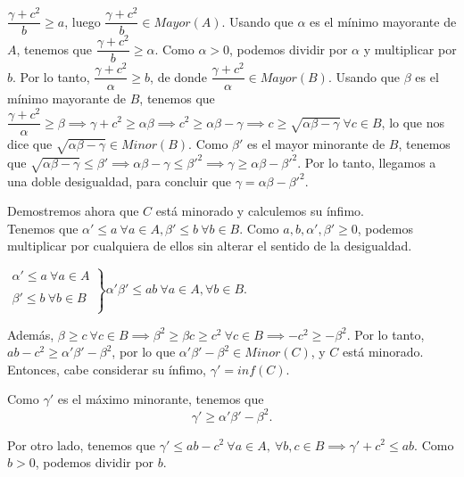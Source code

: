 \documentclass[10pt,a4paper]{article}
\begin{document}
	$\dfrac{\gamma + c^2}{b} \geq a$, luego $\dfrac{\gamma+c^2}{b} \in Mayor(A)$. Usando que $\alpha$ es el mínimo mayorante de $A$, tenemos que $\dfrac{\gamma+c^2}{b} \geq \alpha$. Como $\alpha > 0$, podemos dividir por $\alpha$ y multiplicar por $b$. Por lo tanto, $\dfrac{\gamma+c^2}{\alpha} \geq b$, de donde $\dfrac{\gamma+c^2}{\alpha} \in Mayor(B)$. Usando que $\beta$ es el mínimo mayorante de $B$, tenemos que $\dfrac{\gamma+c^2}{\alpha} \geq \beta \implies \gamma + c^2 \geq \alpha\beta \implies c^2 \geq \alpha\beta-\gamma \implies c \geq \sqrt{\alpha\beta-\gamma} ~ \forall c \in B$, lo que nos dice que $\sqrt{\alpha \beta-\gamma} \in Minor(B)$. Como $\beta'$ es el mayor minorante de $B$, tenemos que $\sqrt{\alpha \beta-\gamma} \leq \beta' \implies \alpha\beta-\gamma \leq \beta'^2 \implies \gamma \geq \alpha\beta-\beta'^2$. Por lo tanto, llegamos a una doble desigualdad, para concluir que $\gamma = \alpha\beta-\beta'^2$. \newline
	
	Demostremos ahora que $C$ está minorado y calculemos su ínfimo. \\
	
	Tenemos que $\alpha' \leq a ~ \forall a \in A, \beta' \leq b ~ \forall b \in B$. Como $a, b, \alpha', \beta' \geq 0$, podemos multiplicar por cualquiera de ellos sin alterar el sentido de la desigualdad. \newline
	
	$\left.\begin{array}{lcc}
		\alpha' \leq a ~ \forall a \in A\\
		\\ \beta' \leq b ~ \forall b \in B \\
	\end{array}\right\rbrace \alpha'\beta' \leq ab ~ \forall a \in A, \forall b \in B$. \newline
	
	Además, $\beta \geq c ~ \forall c \in B \implies \beta^2 \geq \beta c \geq c^2 ~ \forall c \in B \implies -c^2 \geq -\beta^2$. Por lo tanto, $ab-c^2 \geq \alpha'\beta'-\beta^2$, por lo que $\alpha'\beta'-\beta^2 \in Minor(C)$, y $C$ está minorado. Entonces, cabe considerar su ínfimo, $\gamma' = inf(C)$. \newline
	
	Como $\gamma'$ es el máximo minorante, tenemos que 
	\begin{equation}
		\gamma' \geq \alpha'\beta'-\beta^2.
	\end{equation}
	
	Por otro lado, tenemos que $\gamma' \leq ab-c^2 ~ \forall a \in A, ~ \forall b, c \in B \implies \gamma' + c^2 \leq ab$. Como $b > 0$, podemos dividir por $b$. \newline	
	
\end{document}
